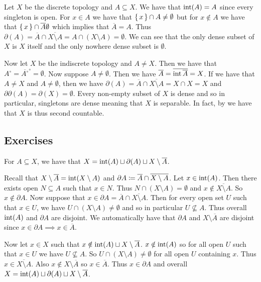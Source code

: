 \documentclass[letterpaper, 11pt, oneside]{book}
\begin{document}
\begin{ex}
  Let $X$ be the discrete topology and $A \subseteq X$.
  We have that $\operatorname{int}(A) = A$ since every singleton is open.
  For $x \in A$ we have that $\set{x} \cap A \neq \emptyset$ but for $x \notin A$ we have that $\set{x} \cap \overline{A} \emptyset$ which implies that $\overline{A} = A$.
  Thus $\partial(A) = \overline{A} \cap \overline{X \setminus A} = A \cap (X \setminus A) =
  \emptyset$.
  We can see that the only dense subset of $X$ is $X$ itself and the only nowhere dense subset is $\emptyset$.

  Now let $X$ be the indiscrete topology and $A \neq X$.
  Then we have that $A^{\circ} = \overline{A^{\circ}}^{\circ} = \emptyset$.
  Now suppose $A \neq \emptyset$.
  Then we have $\overline{A} = \overline{\operatorname{int}{\overline{A}}} = X$.
  If we have that $A \neq X$ and $A \neq \emptyset$, then we have $\partial(A) = \overline{A} \cap \overline{X \setminus A} = X \cap X = X$ and $\partial \partial(A) = \partial(X) = \emptyset$.
  Every non-empty subset of $X$ is dense and so in particular, singletons are dense meaning that $X$ is separable.
  In fact, by  we have that $X$ is thus second countable.

\end{ex}

\clearpage

\subsection*{Exercises}

\begin{exercise}
  For $A \subseteq X$, we have that $X = \operatorname{int}(A) \sqcup \partial(A) \sqcup X \setminus \overline{A}$.
\end{exercise}
\begin{pf}
  Recall that $X \setminus \overline{A} = \operatorname{int}(X \setminus A)$ and $\partial A \coloneqq \overline{A} \cap \overline{X \setminus A}$.
  Let $x \in \operatorname{int}(A)$.
  Then there exists open $N \subseteq A$ such that $x \in N$.
  Thus $N \cap (X \setminus A) = \emptyset$ and $x \notin \overline{X \setminus A}$.
  So $x \notin \partial A$.
  Now suppose that $x \in \partial A = \overline{A} \cap \overline{X \setminus A}$.
  Then for every open set $U$ such that $x \in U$, we have $U \cap (X \setminus A) \neq \emptyset$ and so in particular $U \not\subseteq A$.
  Thus overall $\operatorname{int}(A)$ and $\partial A$ are disjoint.
  We automatically have that $\partial A$ and $X \setminus \overline{A}$ are disjoint since $x \in \partial A \implies x \in \overline{A}$.

  Now let $x \in X$ such that $x \notin \operatorname{int}(A) \sqcup X \setminus \overline{A}$.
  $x \notin \operatorname{int}(A)$ so for all open $U$ such that $x \in U$ we have $U \not\subseteq A$.
  So $U \cap (X \setminus A) \neq \emptyset$ for all open $U$ containing $x$.
  Thus $x \in \overline{X \setminus A}$.
  Also $x \notin X \setminus \overline{A}$ so $x \in \overline{A}$.
  Thus $x \in \partial A$ and overall $X = \operatorname{int}(A) \sqcup \partial(A) \sqcup X \setminus \overline{A}$.
\end{pf}
\end{document}

